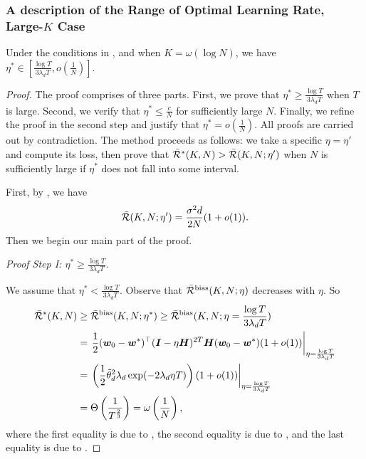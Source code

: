 \subsubsection{A description of the Range of Optimal Learning Rate, Large-$K$ Case}
\begin{lemma} \label{lem:convex-opt-lr-range-large-K}
    Under the conditions in , and when $K=\omega\left(\log N\right)$, we have $\eta^* \in [\frac{\log T}{3\lambda_d T}, o\left(\frac{1}{N}\right)]$.
\end{lemma}
\begin{proof}
    The proof comprises of three parts. First, we prove that $\eta^* \geq \frac{\log T}{3\lambda_dT}$ when $T$ is large. Second, we verify that $\eta^* \leq \frac{c}{N}$ for sufficiently large $N$. Finally, we refine the proof in the second step and justify that $\eta^* = o\left(\frac{1}{N}\right)$. All proofs are carried out by contradiction. The method proceeds as follows: we take a specific $\eta=\eta'$ and compute its loss, then prove that $\Bar{\mathcal{R}}^*(K, N)>\Bar{\mathcal{R}}(K, N;\eta')$ when $N$ is sufficiently large if $\eta^*$ does not fall into some interval.

    First, by , we have 
    \begin{align*}
        \Bar{\mathcal{R}}(K, N;\eta') = \frac{\sigma^2d}{2N}(1+o(1)).
    \end{align*}
    Then we begin our main part of the proof.
    
    \textit{Proof Step I: $\eta^* \geq \frac{\log T}
    {3\lambda_dT}$.}
    
    We assume that $\eta^* < \frac{\log T}{3\lambda_dT}$. Observe that $\Bar{\mathcal{R}}^{\mathrm{bias}}(K, N;\eta)$ decreases with $\eta$. So 
    \begin{align*}
        \Bar{\mathcal{R}}^*(K, N)&\geq \Bar{\mathcal{R}}^{\mathrm{bias}}(K, N;\eta^*)\geq \Bar{\mathcal{R}}^{\mathrm{bias}}(K, N;\eta=\frac{\log T}{3\lambda_dT}) \\
        &=\left.\frac{1}{2}({\bm{w}}_0 - {\bm{w}}^*)^{\top} ({\bm{I}}-\eta{\bm{H}})^{2T}{\bm{H}} ({\bm{w}}_0 - {\bm{w}}^*)(1+o(1))\right|_{\eta=\frac{\log T}{3\lambda_dT}} \\
        &= \left.\left(\frac{1}{2}\Tilde{\theta}_d^2 \lambda_d \exp(-2\lambda_d \eta T)\right)(1+o(1))\right|_{\eta=\frac{\log T}{3\lambda_dT}} \\
        &=\Theta\left(\frac{1}{T^{\frac{2}{3}}}\right)=\omega\left(\frac{1}{N}\right),
    \end{align*}
    where the first equality is due to , the second equality is due to , and the last equality is due to .


\end{proof}
